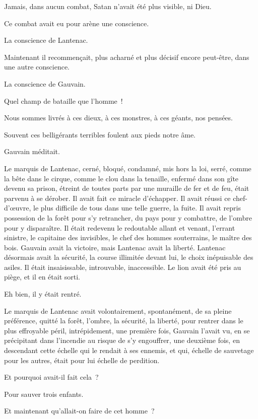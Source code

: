 \documentclass[french,twoside]{book} %
\begin{document}
Jamais, dans aucun combat, Satan n’avait été plus visible, ni Dieu.\par
Ce combat avait eu pour arène une conscience.\par
La conscience de Lantenac.\par
Maintenant il recommençait, plus acharné et plus décisif encore peut-être, dans une autre conscience.\par
La conscience de Gauvain.\par
Quel champ de bataille que l’homme !\par
Nous sommes livrés à ces dieux, à ces monstres, à ces géants, nos pensées.\par
Souvent ces belligérants terribles foulent aux pieds notre âme.\par
Gauvain méditait.\par
Le marquis de Lantenac, cerné, bloqué, condamné, mis hors la loi, serré, comme la bête dans le cirque, comme le clou dans la tenaille, enfermé dans son gîte devenu sa prison, étreint de toutes parts par une muraille de fer et de feu, était parvenu à se dérober. Il  avait fait ce miracle d’échapper. Il avait réussi ce chef-d’œuvre, le plus difficile de tous dans une telle guerre, la fuite. Il avait repris possession de la forêt pour s’y retrancher, du pays pour y combattre, de l’ombre pour y disparaître. Il était redevenu le redoutable allant et venant, l’errant sinistre, le capitaine des invisibles, le chef des hommes souterrains, le maître des bois. Gauvain avait la victoire, mais Lantenac avait la liberté. Lantenac désormais avait la sécurité, la course illimitée devant lui, le choix inépuisable des asiles. Il était insaisissable, introuvable, inaccessible. Le lion avait été pris au piège, et il en était sorti.\par
Eh bien, il y était rentré.\par
Le marquis de Lantenac avait volontairement, spontanément, de sa pleine préférence, quitté la forêt, l’ombre, la sécurité, la liberté, pour rentrer dans le plus effroyable péril, intrépidement, une première fois, Gauvain l’avait vu, en se précipitant dans l’incendie au risque de s’y engouffrer, une deuxième fois, en descendant cette échelle qui le rendait à ses ennemis, et qui, échelle de sauvetage pour les autres, était pour lui échelle de perdition.\par
Et pourquoi avait-il fait cela ?\par
Pour sauver trois enfants.\par
Et maintenant qu’allait-on faire de cet homme ?\par
\end{document}
